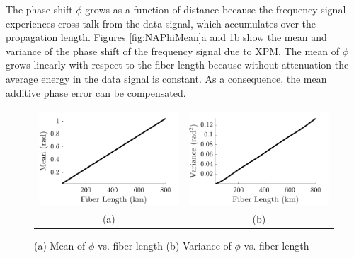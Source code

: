 The phase shift $\phi$ grows as a function of distance because the frequency signal experiences cross-talk from the data signal, which accumulates over the propagation length. Figures \ref{fig:NAPhiMean}a and \ref{fig:NAPhiVar}b show the mean and variance of the phase shift of the frequency signal due to XPM. The mean of $\phi$ grows linearly with respect to the fiber length because without attenuation the average energy in the data signal is constant. As a consequence, the mean additive phase error can be compensated.
%
\begin{figure}[htb]
	\begin{tabular}{c c}
		\includegraphics[width=0.5\linewidth]{img/NAPhiMean} & \includegraphics[width=0.5\linewidth]{img/NAPhiVar} \\
		(a) & (b)
	\end{tabular}
	\caption{(a)\label{fig:NAPhiMean} Mean of $\phi$ vs. fiber length (b)\label{fig:NAPhiVar} Variance of $\phi$ vs. fiber length}
\end{figure}
%

